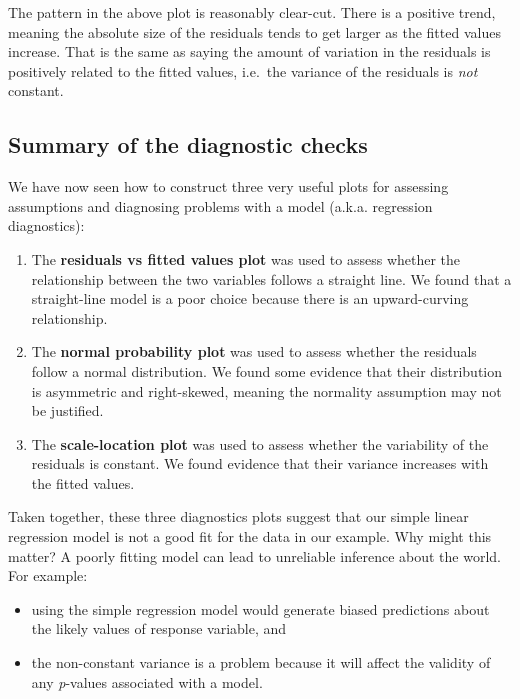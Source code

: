 \documentclass[
]{book}
\providecommand{\tightlist}{%
  \setlength{\itemsep}{0pt}\setlength{\parskip}{0pt}}
\begin{document}
The pattern in the above plot is reasonably clear-cut. There is a positive trend, meaning the absolute size of the residuals tends to get larger as the fitted values increase. That is the same as saying the amount of variation in the residuals is positively related to the fitted values, i.e.~the variance of the residuals is \emph{not} constant.

\hypertarget{summary-of-the-diagnostic-checks}{%
\subsection{Summary of the diagnostic checks}\label{summary-of-the-diagnostic-checks}}

We have now seen how to construct three very useful plots for assessing assumptions and diagnosing problems with a model (a.k.a. regression diagnostics):

\begin{enumerate}
\def\labelenumi{\arabic{enumi}.}
\tightlist
\item
  The \textbf{residuals vs fitted values plot} was used to assess whether the relationship between the two variables follows a straight line. We found that a straight-line model is a poor choice because there is an upward-curving relationship.
\item
  The \textbf{normal probability plot} was used to assess whether the residuals follow a normal distribution. We found some evidence that their distribution is asymmetric and right-skewed, meaning the normality assumption may not be justified.
\item
  The \textbf{scale-location plot} was used to assess whether the variability of the residuals is constant. We found evidence that their variance increases with the fitted values.
\end{enumerate}

Taken together, these three diagnostics plots suggest that our simple linear regression model is not a good fit for the data in our example. Why might this matter? A poorly fitting model can lead to unreliable inference about the world. For example:

\begin{itemize}
\tightlist
\item
  using the simple regression model would generate biased predictions about the likely values of response variable, and
\item
  the non-constant variance is a problem because it will affect the validity of any \emph{p}-values associated with a model.
\end{itemize}
\end{document}
